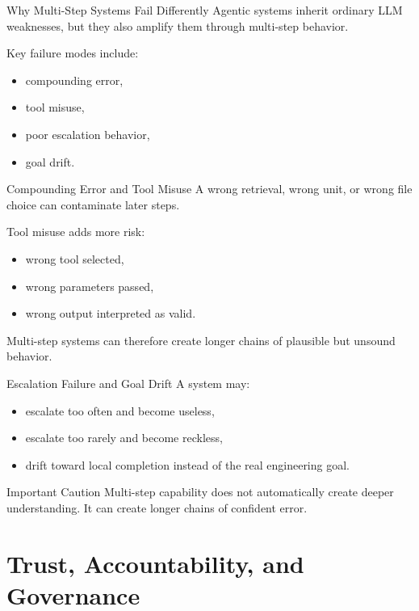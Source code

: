 \documentclass[12pt]{beamer}
\begin{document}
\begin{frame}{Why Multi-Step Systems Fail Differently}
  Agentic systems inherit ordinary LLM weaknesses, but they also amplify them through multi-step behavior.

  Key failure modes include:
  \begin{itemize}
    \item compounding error,
    \item tool misuse,
    \item poor escalation behavior,
    \item goal drift.
  \end{itemize}
\end{frame}

\begin{frame}{Compounding Error and Tool Misuse}
  A wrong retrieval, wrong unit, or wrong file choice can contaminate later steps.

  Tool misuse adds more risk:
  \begin{itemize}
    \item wrong tool selected,
    \item wrong parameters passed,
    \item wrong output interpreted as valid.
  \end{itemize}

  Multi-step systems can therefore create longer chains of plausible but unsound behavior.
\end{frame}

\begin{frame}{Escalation Failure and Goal Drift}
  A system may:
  \begin{itemize}
    \item escalate too often and become useless,
    \item escalate too rarely and become reckless,
    \item drift toward local completion instead of the real engineering goal.
  \end{itemize}

  \begin{warningbox}{Important Caution}
    Multi-step capability does not automatically create deeper understanding. It can create longer chains of confident error.
  \end{warningbox}
\end{frame}

\section{Trust, Accountability, and Governance}
\end{document}

